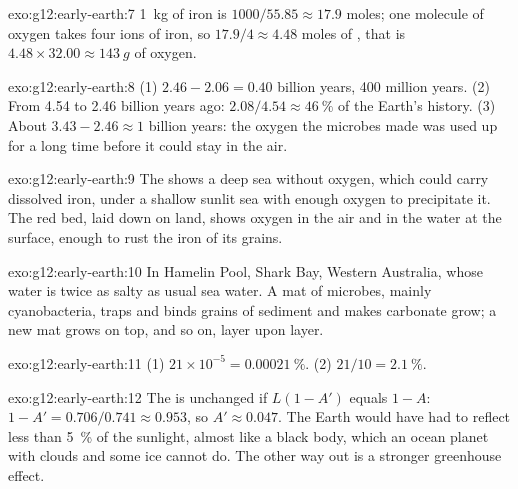\begin{solution}{exo:g12:early-earth:7}
\qty{1}{kg} of iron is $1000/55.85 \approx 17.9$ moles; one molecule of
oxygen takes four ions of iron, so $17.9/4 \approx 4.48$ moles of
, that is $4.48 \times 32.00 \approx \qty{143}{g}$ of oxygen.
\end{solution}

\begin{solution}{exo:g12:early-earth:8}
(1) $2.46 - 2.06 = 0.40$ billion years, 400 million years. (2) From 4.54
to 2.46 billion years ago: $2.08/4.54 \approx \qty{46}{\percent}$ of the
Earth's history. (3) About $3.43 - 2.46 \approx 1$ billion years: the oxygen
the microbes made was used up for a long time before it could stay in the
air.
\end{solution}

\begin{solution}{exo:g12:early-earth:9}
The  shows a deep sea without oxygen, which could carry
dissolved iron, under a shallow sunlit sea with enough oxygen to precipitate
it. The red bed, laid down on land, shows oxygen in the air and in the water
at the surface, enough to rust the iron of its grains.
\end{solution}

\begin{solution}{exo:g12:early-earth:10}
In Hamelin Pool, Shark Bay, Western Australia, whose water is twice as
salty as usual sea water. A mat of microbes, mainly cyanobacteria, traps and
binds grains of sediment and makes carbonate grow; a new mat grows on top,
and so on, layer upon layer.
\end{solution}

\begin{solution}{exo:g12:early-earth:11}
(1) $21 \times 10^{-5} = \qty{0.00021}{\percent}$. (2) $21/10 =
\qty{2.1}{\percent}$.
\end{solution}

\begin{solution}{exo:g12:early-earth:12}
The  is unchanged if $L(1 - A')$ equals $1 - A$:
$1 - A' = 0.706/0.741 \approx 0.953$, so $A' \approx 0.047$. The Earth would
have had to reflect less than \qty{5}{\percent} of the sunlight, almost like a
black body, which an ocean planet with clouds and some ice cannot do. The
other way out is a stronger greenhouse effect.
\end{solution}

